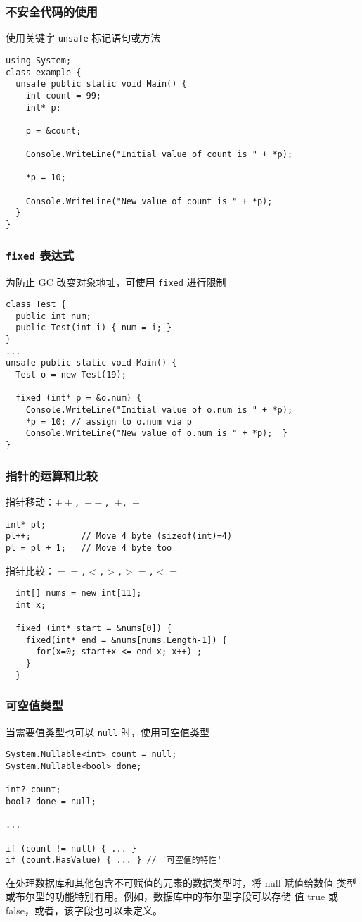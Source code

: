 \begin{frame}[fragile]
\frametitle{不安全代码的使用}
使用关键字 \texttt{unsafe} 标记语句或方法
\begin{lstlisting}
using System;
class example {
  unsafe public static void Main() {
    int count = 99;
    int* p;

    p = &count;

    Console.WriteLine("Initial value of count is " + *p);

    *p = 10;

    Console.WriteLine("New value of count is " + *p);
  }
}
\end{lstlisting}
\end{frame}

\begin{frame}[fragile]
\frametitle{\texttt{fixed} 表达式}
为防止 GC 改变对象地址，可使用 \texttt{fixed} 进行限制
\begin{lstlisting}
class Test {
  public int num;
  public Test(int i) { num = i; }
}
...
unsafe public static void Main() {
  Test o = new Test(19);

  fixed (int* p = &o.num) {
    Console.WriteLine("Initial value of o.num is " + *p);
    *p = 10; // assign to o.num via p
    Console.WriteLine("New value of o.num is " + *p);  }
}
\end{lstlisting}
\end{frame}

\begin{frame}[fragile]
\frametitle{指针的运算和比较}
指针移动：\texttt{$++$, $--$, $+$, $-$}
\begin{lstlisting}
int* pl;
pl++;          // Move 4 byte (sizeof(int)=4)
pl = pl + 1;   // Move 4 byte too
\end{lstlisting}
\pause
指针比较：\texttt{$==$,$<$,$>$,$>=$,$<=$}
\begin{lstlisting}
  int[] nums = new int[11];
  int x;

  fixed (int* start = &nums[0]) {
    fixed(int* end = &nums[nums.Length-1]) {
      for(x=0; start+x <= end-x; x++) ;
    }
  }

\end{lstlisting}
\end{frame}

\begin{frame}[fragile]
\frametitle{可空值类型}
当需要值类型也可以 \texttt{null} 时，使用可空值类型

\begin{lstlisting}[escapeinside='']
System.Nullable<int> count = null;
System.Nullable<bool> done;

int? count;
bool? done = null;

...

if (count != null) { ... }
if (count.HasValue) { ... } // '可空值的特性'
\end{lstlisting}

\CJKindent 在处理数据库和其他包含不可赋值的元素的数据类型时，将 null 赋值给数值
类型或布尔型的功能特别有用。例如，数据库中的布尔型字段可以存储
值 true 或 false，或者，该字段也可以未定义。
\end{frame}

